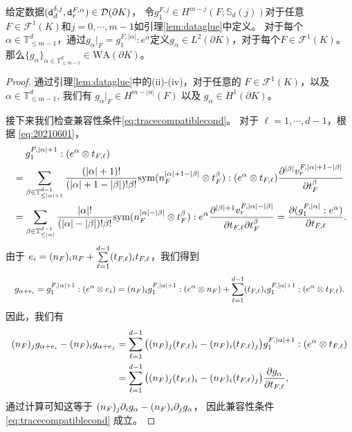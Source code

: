 \begin{lemma}\label{lem:datawhitneyarray}
给定数据$(\textnormal{\texttt{d}}_{d}^{\delta, j}, \textnormal{\texttt{d}}_{r}^{F, \alpha})\in\mathcal D(\partial K)$，
令$g_{1}^{F,j}\in H^{m-j}(F;\mathbb S_d(j))$对于任意$F\in\mathcal
F^1(K)$和$j=0,\cdots,m-1$如引理\ref{lem:dataglue}中定义。
对于每个$\alpha\in \mathbb{T}^d_{\leq m-1}$，通过$g_{\alpha}|_F=g_{1}^{F,|\alpha|}:e^{\alpha}$定义$g_{\alpha}\in L^2(\partial K)$，对于每个$F\in\mathcal F^1(K)$。
那么$\{g_{\alpha}\}_{\alpha\in \mathbb{T}^d_{\leq m-1}}\in \textrm{WA}(\partial K)$。
\end{lemma}
\begin{proof}
通过引理\ref{lem:dataglue}中的(ii)-(iv)，对于任意的
$F\in\mathcal
F^1(K)$，以及$\alpha\in \mathbb{T}^d_{\leq m-1}$, 我们有 $g_{\alpha}|_F\in
H^{m-|\alpha|}(F)$ 以及 $g_{\alpha}\in H^1(\partial K)$。

接下来我们检查兼容性条件\eqref{eq:tracecompatiblecond}。
对于 $\ell=1,\cdots, d-1$，根据 \eqref{eq:20210601}，
$$
\resizebox{1.0\textwidth}{!}{$
\begin{aligned}
&\quad\; g_{1}^{F,|\alpha|+1}:(e^{\alpha}\otimes t_{F,\ell}) \\
&=\sum_{\beta\in \mathbb{T}^{d-1}_{\leq |\alpha|+1}}\frac{(|\alpha|+1)!}{(|\alpha|+1-|\beta|)!\beta!}\mathrm{sym}(\nnn_F^{|\alpha|+1-|\beta|}\otimes t_{F}^{\beta}):(e^{\alpha}\otimes t_{F,\ell})\frac{\partial^{|\beta|}v_r^{F,|\alpha|+1-|\beta|}}{\partial t_{F}^{\beta}} \\
&=\sum_{\beta\in \mathbb{T}^{d-1}_{\leq |\alpha|}}\frac{|\alpha|!}{(|\alpha|-|\beta|)!\beta!}\mathrm{sym}(\nnn_F^{|\alpha|-|\beta|}\otimes t_{F}^{\beta}):e^{\alpha}\frac{\partial^{|\beta|+1}v_r^{F,|\alpha|-|\beta|}}{\partial t_{F,\ell}\partial t_{F}^{\beta}} = \frac{\partial(g_{1}^{F,|\alpha|}:e^{\alpha})}{\partial t_{F,\ell}}.
\end{aligned}
$}
$$
由于 $e_i=(n_F)_in_F+\sum\limits_{\ell=1}^{d-1}(t_{F,\ell})_it_{F,\ell}$，我们得到
\begin{equation*}
\resizebox{0.99\textwidth}{!}{$\displaystyle
g_{\alpha+e_i}=g_{1}^{F,|\alpha|+1}:(e^{\alpha}\otimes e_i) =(\nnn_F)_ig_{1}^{F,|\alpha|+1}:(e^{\alpha}\otimes\nnn_F) + \sum_{\ell=1}^{d-1}(t_{F,\ell})_ig_{1}^{F,|\alpha|+1}:(e^{\alpha}\otimes t_{F,\ell}).
$}
\end{equation*}
因此，我们有
\begin{align*}
(n_F)_jg_{\alpha+e_i}-(n_F)_ig_{\alpha+e_j}&=\sum_{\ell=1}^{d-1}\big((n_F)_j(t_{F,\ell})_i-(n_F)_i(t_{F,\ell})_j\big)g_{1}^{F,|\alpha|+1}:(e^{\alpha}\otimes t_{F,\ell}) \\
&=\sum_{\ell=1}^{d-1}\big((n_F)_j(t_{F,\ell})_i-(n_F)_i(t_{F,\ell})_j\big)\frac{\partial g_{\alpha}}{\partial t_{F,\ell}},
\end{align*}
通过计算可知这等于
$(n_F)_j\partial_ig_{\alpha}-(n_F)_i\partial_jg_{\alpha}$，
因此兼容性条件 \eqref{eq:tracecompatiblecond} 成立。
\end{proof}

